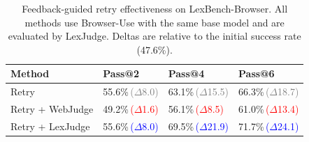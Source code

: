 \newcommand{\dgain}[1]{\textcolor{blue}{\scriptsize\,($\Delta$#1)}}
\newcommand{\dloss}[1]{\textcolor{red}{\scriptsize\,($\Delta$#1)}}
\newcommand{\dbase}[1]{\textcolor{gray}{\scriptsize\,($\Delta$#1)}}

\begin{table}[t]
\caption{Feedback-guided retry effectiveness on LexBench-Browser. All methods use Browser-Use with the same base model and are evaluated by LexJudge. Deltas are relative to the initial success rate (47.6\%).}
\centering
\small
\begin{tabularx}{\columnwidth}{lXXX}
\toprule
Method & Pass@2 & Pass@4 & Pass@6 \\
\midrule
Retry
& 55.6\%\dbase{8.0}
& 63.1\%\dbase{15.5}
& 66.3\%\dbase{18.7} \\
Retry + WebJudge
& 49.2\%\dloss{1.6}
& 56.1\%\dloss{8.5}
& 61.0\%\dloss{13.4} \\
Retry + LexJudge
& 55.6\%\dgain{8.0}
& 69.5\%\dgain{21.9}
& 71.7\%\dgain{24.1} \\
\bottomrule
\end{tabularx}
\label{tab:retry}
\end{table}
